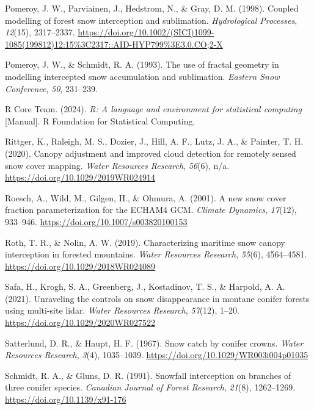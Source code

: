 \documentclass[
  letterpaper,
  DIV=11,
  numbers=noendperiod]{scrartcl}
\newlength{\cslhangindent}
\newenvironment{CSLReferences}[2] %
 {\begin{list}{}{%
  \setlength{\itemindent}{0pt}
  \setlength{\leftmargin}{0pt}
  \setlength{\parsep}{0pt}
  \ifodd #1
   \setlength{\leftmargin}{\cslhangindent}
   \setlength{\itemindent}{-1\cslhangindent}
  \fi
  \setlength{\itemsep}{#2\baselineskip}}}
 {\end{list}}
\begin{document}
\begin{CSLReferences}{1}{0}
Pomeroy, J. W., Parviainen, J., Hedstrom, N., \& Gray, D. M. (1998).
Coupled modelling of forest snow interception and sublimation.
\emph{Hydrological Processes}, \emph{12}(15), 2317--2337.
\url{https://doi.org/10.1002/(SICI)1099-1085(199812)12:15\%3C2317::AID-HYP799\%3E3.0.CO;2-X}

Pomeroy, J. W., \& Schmidt, R. A. (1993). The use of fractal geometry in
modelling intercepted snow accumulation and sublimation. \emph{Eastern
Snow Conference}, \emph{50}, 231--239.

R Core Team. (2024). \emph{R: A language and environment for statistical
computing} {[}Manual{]}. R Foundation for Statistical Computing.

Rittger, K., Raleigh, M. S., Dozier, J., Hill, A. F., Lutz, J. A., \&
Painter, T. H. (2020). Canopy adjustment and improved cloud detection
for remotely sensed snow cover mapping. \emph{Water Resources Research},
\emph{56}(6), n/a. \url{https://doi.org/10.1029/2019WR024914}

Roesch, A., Wild, M., Gilgen, H., \& Ohmura, A. (2001). A new snow cover
fraction parameterization for the {ECHAM4 GCM}. \emph{Climate Dynamics},
\emph{17}(12), 933--946. \url{https://doi.org/10.1007/s003820100153}

Roth, T. R., \& Nolin, A. W. (2019). Characterizing maritime snow canopy
interception in forested mountains. \emph{Water Resources Research},
\emph{55}(6), 4564--4581. \url{https://doi.org/10.1029/2018WR024089}

Safa, H., Krogh, S. A., Greenberg, J., Kostadinov, T. S., \& Harpold, A.
A. (2021). Unraveling the controls on snow disappearance in montane
conifer forests using multi-site lidar. \emph{Water Resources Research},
\emph{57}(12), 1--20. \url{https://doi.org/10.1029/2020WR027522}

Satterlund, D. R., \& Haupt, H. F. (1967). Snow catch by conifer crowns.
\emph{Water Resources Research}, \emph{3}(4), 1035--1039.
\url{https://doi.org/10.1029/WR003i004p01035}

Schmidt, R. A., \& Gluns, D. R. (1991). Snowfall interception on
branches of three conifer species. \emph{Canadian Journal of Forest
Research}, \emph{21}(8), 1262--1269.
\url{https://doi.org/10.1139/x91-176}


\end{CSLReferences}
\end{document}
